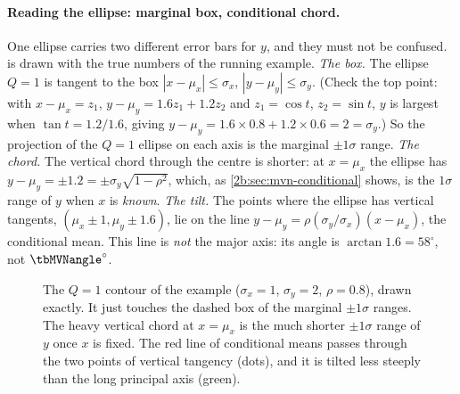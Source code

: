 \paragraph{Reading the ellipse: marginal box, conditional chord.} One ellipse carries two different error bars for $y$, and they must not be confused.  is drawn with the true numbers of the running example. \emph{The box.} The ellipse $Q=1$ is tangent to the box $|x-\mu_x|\le\sigma_x$, $|y-\mu_y|\le\sigma_y$. (Check the top point: with $x-\mu_x=z_1$, $y-\mu_y=1.6z_1+1.2z_2$ and $z_1=\cos t$, $z_2=\sin t$, $y$ is largest when $\tan t=1.2/1.6$, giving $y-\mu_y=1.6\times0.8+1.2\times0.6=2=\sigma_y$.) So the projection of the $Q=1$ ellipse on each axis is the marginal $\pm1\sigma$ range. \emph{The chord.} The vertical chord through the centre is shorter: at $x=\mu_x$ the ellipse has $y-\mu_y=\pm1.2=\pm\sigma_y\sqrt{1-\rho^2}$, which, as \cref{2b:sec:mvn-conditional} shows, is the $1\sigma$ range of $y$ when $x$ is \emph{known}. \emph{The tilt.} The points where the ellipse has vertical tangents, $(\mu_x\pm1,\mu_y\pm1.6)$, lie on the line $y-\mu_y=\rho(\sigma_y/\sigma_x)(x-\mu_x)$, the conditional mean. This line is \emph{not} the major axis: its angle is $\arctan1.6=58^\circ$, not $\tbMVNangle^\circ$.

\begin{figure}[htbp]
\centering
{}
\caption{The $Q=1$ contour of the example ($\sigma_x=1$, $\sigma_y=2$, $\rho=0.8$), drawn exactly. It just touches the dashed box of the marginal $\pm1\sigma$ ranges. The heavy vertical chord at $x=\mu_x$ is the much shorter $\pm1\sigma$ range of $y$ once $x$ is fixed. The red line of conditional means passes through the two points of vertical tangency (dots), and it is tilted less steeply than the long principal axis (green).}
\label{2b:fig:ellipse-geometry}
\end{figure}

